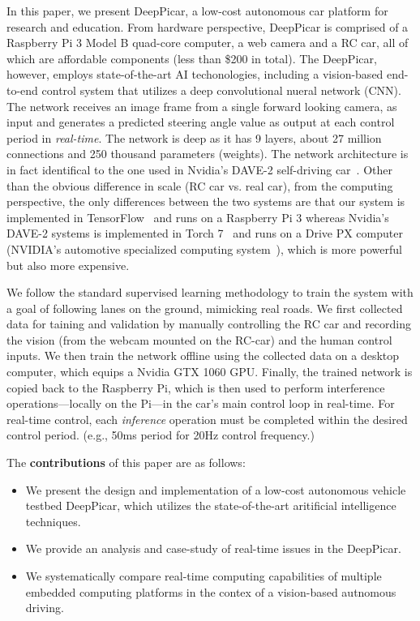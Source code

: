 In this paper, we present DeepPicar, a low-cost autonomous car
platform for research and education. From hardware perspective, 
DeepPicar is comprised of a Raspberry Pi 3 Model B quad-core
computer, a web camera and a RC car, all of which are affordable
components (less than \$200 in total).
The DeepPicar, however, employs state-of-the-art AI
techonologies, including a vision-based end-to-end control system that
utilizes a deep convolutional nueral network (CNN).
The network receives an image frame from a single forward
looking camera, as input and generates a predicted steering angle
value as output at each control period in \emph{real-time}. 
The network is deep as it has 9 layers, about 27 million connections
and 250 thousand parameters (weights).
The network architecture is in fact identifical to the one
used in Nvidia's DAVE-2 self-driving car~\cite{Bojarski2016}. Other
than the obvious difference in scale (RC car vs. real car), from the
computing perspective, the only differences between
the two systems are that our system is implemented in
TensorFlow~\cite{abadi2016tensorflow} and runs on a 
Raspberry Pi 3 whereas Nvidia's DAVE-2 systems is implemented in Torch
7~\cite{collobert2011torch7} and runs on a Drive PX computer (NVIDIA's
automotive specialized computing system~\cite{drivepx}), which is more
powerful but also more expensive.

We follow the standard supervised learning methodology to train the
system with a goal of following lanes on the ground, mimicking real
roads. We first collected data for taining and validation by manually 
controlling the RC car and recording the vision (from the webcam
mounted on the RC-car) and the human control inputs. We then train the
network offline using the collected data on a desktop computer, which
equips a Nvidia GTX 1060 GPU. Finally, the trained network is copied
back to the Raspberry Pi, which is then used to perform interference
operations---locally on the Pi---in the car's main control loop in
real-time. For real-time control, each \emph{inference} operation must
be completed within the desired control period. (e.g., 50ms period for
20Hz control frequency.)


The {\bf contributions} of this paper are as follows:
\begin{itemize}
  \item We present the design and implementation of a
    low-cost autonomous vehicle testbed DeepPicar, which utilizes the
    state-of-the-art aritificial intelligence techniques.
  \item We provide an analysis and case-study of real-time issues in the
    DeepPicar.
  \item We systematically compare real-time computing capabilities of
    multiple embedded computing platforms in the contex of a
    vision-based autnomous driving.
\end{itemize}

